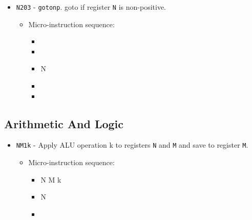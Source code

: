 \documentclass{article}
\begin{document}
\begin{itemize}
    \item \Verb|N203| - \Verb|gotonp|. goto if register \Verb|N| is non-positive.
    \begin{itemize}
        \item Micro-instruction sequence:
        \begin{itemize}
            \item \pkptroutinc
            \item \datatotmpa
            \item \regtodata N
            \item \tmpatopkifnp
            \item \done
        \end{itemize}
    \end{itemize}
\end{itemize}

\subsection{Arithmetic And Logic}

\begin{itemize}
    \item \Verb|NM1k| - Apply ALU operation k to registers \Verb|N| and \Verb|M| and save to register \Verb|M|.
    \begin{itemize}
        \item Micro-instruction sequence:
        \begin{itemize}
            \item \ALUop N M k 
            \item \datatoreg N
            \item \done
        \end{itemize}
    \end{itemize}
    
    \iffalse
    \item \Verb|002k| - Apply ALU operation k to registers N and M and save to register K, where \Verb|*(pk+1) = []NMK|.
    \begin{itemize}
        \item Micro-instruction sequence:
        \begin{itemize}
            \item \incrementpk
            \item \pkptroutinc
            \item \datatotmpA
            \item \ALUop 0 0 k 
            \item \datatotmpB
            \item \tmpBtodata
            \item \datatoreg 0
            \item \done
        \end{itemize}
    \end{itemize}
    \fi
\end{itemize}
\end{document}
